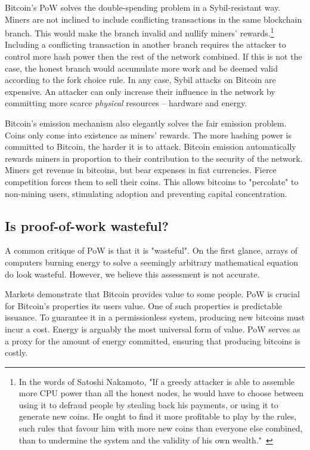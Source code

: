 Bitcoin's PoW solves the double-spending problem in a Sybil-resistant way.
Miners are not inclined to include conflicting transactions in the same blockchain branch.
This would make the branch invalid and nullify miners' rewards.\footnote{In the words of Satoshi Nakamoto, "If a greedy attacker is able to assemble more CPU power than all the honest nodes, he would have to choose between using it to defraud people by stealing back his payments, or using it to generate new coins. He ought to find it more profitable to play by the rules, such rules that favour him with more new coins than everyone else combined, than to undermine the system and the validity of his own wealth."~\cite{nakamoto2008bitcoin}}
Including a conflicting transaction in another branch requires the attacker to control more hash power then the rest of the network combined.
If this is not the case, the honest branch would accumulate more work and be deemed valid according to the fork choice rule.
In any case, Sybil attacks on Bitcoin are expensive.
An attacker can only increase their influence in the network by committing more scarce \textit{physical} resources -- hardware and energy.

Bitcoin's emission mechanism also elegantly solves the fair emission problem.
Coins only come into existence as miners' rewards.
The more hashing power is committed to Bitcoin, the harder it is to attack.
Bitcoin emission automatically rewards miners in proportion to their contribution to the security of the network.
Miners get revenue in bitcoins, but bear expenses in fiat currencies.
Fierce competition forces them to sell their coins.
This allows bitcoins to "percolate" to non-mining users, stimulating adoption and preventing capital concentration.


\subsection{Is proof-of-work wasteful?}

A common critique of PoW is that it is "wasteful".
On the first glance, arrays of computers burning energy to solve a seemingly arbitrary mathematical equation do look wasteful.
However, we believe this assessment is not accurate.

Markets demonstrate that Bitcoin provides value to some people.
PoW is crucial for Bitcoin's properties its users value.
One of such properties is predictable issuance.
To guarantee it in a permissionless system, producing new bitcoins must incur a cost.
Energy is arguably the most universal form of value.
PoW serves as a proxy for the amount of energy committed, ensuring that producing bitcoins is costly.

